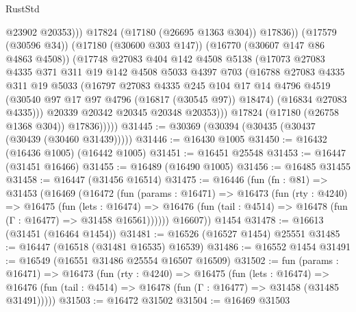 \begin{lexlean}{RustStd}
\begin{coremodule}
                          @23902
                          @20353)))
                    @17824
                    (@17180 (@26695 @1363 @304))
                    @17836))
                (@17579 (@30596 @34))
                (@17180 (@30600 @303 @147))
                (@16770 (@30607 @147 @86 @4863 @4508))
                (@17748
                  @27083
                  @404
                  @142
                  @4508
                  @5138
                  (@17073
                    @27083
                    @4335
                    @371
                    @311
                    @19
                    @142
                    @4508
                    @5033
                    @4397
                    @703
                    (@16788
                      @27083
                      @4335
                      @311
                      @19
                      @5033
                      (@16797
                        @27083
                        @4335
                        @245
                        @104
                        @17
                        @14
                        @4796
                        @4519
                        (@30540 @97 @17 @97 @4796 (@16817 (@30545 @97)) @18474)
                        (@16834 @27083 @4335)))
                    @20339
                    @20342
                    @20345
                    @20348
                    @20353)))
              @17824
              (@17180 (@26758 @1368 @304))
              @17836)))))
@31445 := @30369 (@30394 (@30435 (@30437 (@30439 (@30460 @31439)))))
@31446 := @16430 @1005
@31450 := @16432 (@16436 @1005) (@16442 @1005)
@31451 := @16451 @25548
@31453 := @16447 (@31451 @16466)
@31455 := @16489 (@16490 @1005)
@31456 := @16485 @31455
@31458 := @16447 (@31456 @16514)
@31475 := @16446
    (fun (fn : @81) =>
    @31453
      (@16469
        (@16472
          (fun (params : @16471) =>
          @16473
            (fun (rty : @4240) =>
            @16475
              (fun (lets : @16474) =>
              @16476 (fun (tail : @4514) => @16478 (fun (Γ : @16477) => @31458 @16561))))))
        @16607))
    @1454
@31478 := @16613 (@31451 (@16464 @1454))
@31481 := @16526 (@16527 @1454) @25551
@31485 := @16447 (@16518 (@31481 @16535) @16539)
@31486 := @16552 @1454
@31491 := @16549 (@16551 @31486 @25554 @16507 @16509)
@31502 := fun (params : @16471) =>
  @16473
    (fun (rty : @4240) =>
    @16475
      (fun (lets : @16474) =>
      @16476 (fun (tail : @4514) => @16478 (fun (Γ : @16477) => @31458 (@31485 @31491)))))
@31503 := @16472 @31502
@31504 := @16469 @31503

\end{coremodule}
\end{lexlean}
